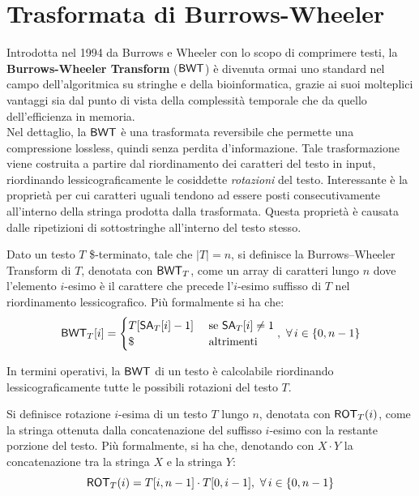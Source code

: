 \section{Trasformata di Burrows-Wheeler}
\label{secbwt}
Introdotta nel 1994 da Burrows e Wheeler con lo scopo di comprimere testi, la
\textbf{Burrows-Wheeler Transform} ($\mbox{\rm {\sf BWT}}$) \cite{bwt} è divenuta ormai uno
standard nel 
campo dell'algoritmica su stringhe e della bioinformatica,
grazie ai suoi molteplici vantaggi sia dal punto di vista della complessità
temporale che da quello dell'efficienza in memoria.\\
Nel dettaglio, la $\mbox{\rm {\sf BWT}}$ è una trasformata reversibile che
permette una compressione lossless, quindi senza perdita
d'informazione. Tale trasformazione viene costruita a partire dal riordinamento
dei caratteri del testo in input, riordinando lessicograficamente le cosiddette
\textit{rotazioni} del testo. Interessante è la proprietà per cui caratteri
uguali tendono ad essere posti consecutivamente all'interno della stringa
prodotta dalla trasformata. Questa proprietà è causata dalle ripetizioni di
sottostringhe all'interno del testo stesso.
\begin{definizione}
  Dato un testo $T$ \$-terminato, tale che $|T|=n$, si definisce la
  Burrows--Wheeler Transform di $T$, denotata con
  $\mbox{\rm {\sf BWT}}_T$, come un array di caratteri lungo $n$ dove l'elemento $i$-esimo è il
  carattere che precede l'$i$-esimo suffisso di $T$ nel riordinamento
  lessicografico. Più formalmente si ha che:
  \begin{equation}
    \label{eq:bwt1}
    \mbox{\rm {\sf BWT}}_T[i]=
    \begin{cases}
      T[\mbox{\rm {\sf SA}}_T[i]-1]&\mbox{ se } \mbox{\rm {\sf SA}}_T[i]\neq 1\\
      \$&\mbox{ altrimenti}
    \end{cases},\,\, \forall\, i\in\{0,n-1\}
  \end{equation}
\end{definizione}
In termini operativi, la $\mbox{\rm {\sf BWT}}$ di un testo è calcolabile riordinando
lessicograficamente tutte le possibili rotazioni del testo $T$.
\begin{definizione}
  Si definisce rotazione $i$-esima di
  un testo $T$ lungo $n$, denotata con $\mbox{\rm {\sf ROT}}_T(i)$, come la stringa ottenuta
  dalla concatenazione 
  del suffisso $i$-esimo con la restante porzione del testo. Più formalmente, si
  ha che, denotando con $X\cdot Y$ la concatenazione tra
  la stringa $X$ e la stringa $Y$:
  \begin{equation}
    \label{eq:bwt2}
    \mbox{\rm {\sf ROT}}_T(i)=T[i,n-1]\cdot T[0,i-1],\,\,\forall\, i\in\{0,n-1\}
  \end{equation}
\end{definizione}
